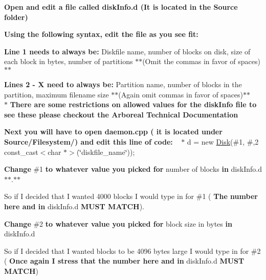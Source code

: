 \begin{DoxyEnumerate}
\item {\bfseries Open and edit a file called {\ttfamily disk\+Info.\+d} (It is located in the {\ttfamily Source} folder)}
\item {\bfseries Using the following syntax, edit the file as you see fit\+:}
\begin{DoxyItemize}
\item {\bfseries Line 1 needs to always be\+:} {\ttfamily Diskfile name, number of blocks on disk, size of each block in bytes, number of partitions} $\ast$$\ast$(Omit the commas in favor of spaces)$\ast$$\ast$
\item {\bfseries Lines 2 -\/ X need to always be\+:} {\ttfamily Partition name, number of blocks in the partition, maximum filename size} $\ast$$\ast$(Again omit commas in favor of spaces)$\ast$$\ast$ ~\newline
 $\ast$ {\bfseries There are some restrictions on allowed values for the {\ttfamily disk\+Info} file to see these please checkout the Arboreal Technical Documentation}
\end{DoxyItemize}
\item {\bfseries Next you will have to open {\ttfamily daemon.\+cpp} ( it is located under {\ttfamily Source/\+Filesystem/}) and edit this line of code\+:} ~\newline
 $\ast$ {\ttfamily d = new \mbox{\hyperlink{classDisk}{Disk}}(\#1, \#,2 const\+\_\+cast$<$char $\ast$$>$(\char`\"{}diskfile\+\_\+name\char`\"{}));}
\begin{DoxyItemize}
\item {\bfseries Change} {\ttfamily \#1} {\bfseries to whatever value you picked for} {\ttfamily number of blocks} {\bfseries in} {\ttfamily disk\+Info.\+d}$\ast$$\ast$.$\ast$$\ast$
\begin{DoxyItemize}
\item So if I decided that I wanted 4000 blocks I would type {} in for {\ttfamily \#1} ( {\bfseries The number here and in} {\ttfamily disk\+Info.\+d} {\bfseries M\+U\+ST M\+A\+T\+CH}).
\end{DoxyItemize}
\item {\bfseries Change} {\ttfamily \#2} {\bfseries to whatever value you picked for} {\ttfamily block size in bytes} {\bfseries in} {\ttfamily disk\+Info.\+d}
\begin{DoxyItemize}
\item So if I decided that I wanted blocks to be 4096 bytes large I would type {} in for {\ttfamily \#2} ( {\bfseries Once again I stress that the number here and in} {\ttfamily disk\+Info.\+d} {\bfseries M\+U\+ST M\+A\+T\+CH})

\end{DoxyItemize}
\end{DoxyItemize}
\end{DoxyEnumerate}
